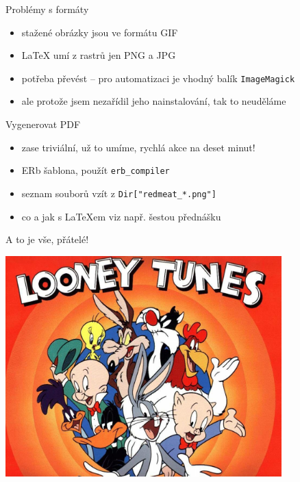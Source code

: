 \documentclass{beamer}
\begin{document}
\begin{frame}{Problémy s formáty}
  \begin{itemize}
    \item stažené obrázky jsou ve formátu GIF
    \item LaTeX umí z rastrů jen PNG a JPG
    \item potřeba převést -- pro automatizaci je vhodný balík \texttt{ImageMagick}
    \item ale protože jsem nezařídil jeho nainstalování, tak to neuděláme
  \end{itemize}
\end{frame}

\begin{frame}{Vygenerovat PDF}
  \begin{itemize}
    \item zase triviální, už to umíme, rychlá akce na deset minut!
    \item ERb šablona, použít \texttt{erb\_compiler}
    \item seznam souborů vzít z \texttt{Dir["redmeat\_*.png"]}
    \item co a jak s LaTeXem viz např. šestou přednášku
  \end{itemize}
\end{frame}

\begin{frame}{A to je vše, přátelé!}
  \begin{center}
    \includegraphics[width=0.8\textwidth]{looney_tunes}
  \end{center}
\end{frame}
\end{document}
